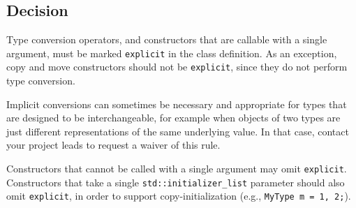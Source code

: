 \subsection{Decision}
Type conversion operators, and constructors that are callable with a single argument, must be marked \texttt{explicit} in the class definition. As an exception, copy and move constructors should not be \texttt{explicit}, since they do not perform type conversion.

Implicit conversions can sometimes be necessary and appropriate for types that are designed to be interchangeable, for example when objects of two types are just different representations of the same underlying value. In that case, contact your project leads to request a waiver of this rule.

Constructors that cannot be called with a single argument may omit \texttt{explicit}. Constructors that take a single \texttt{std::initializer_list} parameter should also omit \texttt{explicit}, in order to support copy-initialization (e.g., \texttt{MyType m = {1, 2};}).
